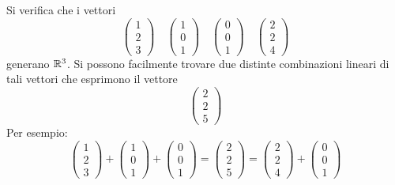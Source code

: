 \begin{example}
	Si verifica che i vettori
	\[
		\begin{pmatrix}
			1 \\ 2 \\ 3
		\end{pmatrix} \quad
		\begin{pmatrix}
			1 \\ 0 \\ 1
		\end{pmatrix} \quad
		\begin{pmatrix}
			0 \\ 0 \\ 1
		\end{pmatrix} \quad
		\begin{pmatrix}
			2 \\ 2 \\ 4
		\end{pmatrix}
	\]
	generano $\mathbb{R}^3$. Si possono facilmente trovare due distinte combinazioni lineari di tali vettori
	che esprimono il vettore
	\[ \begin{pmatrix} 2 \\ 2 \\ 5 \end{pmatrix} \]
	Per esempio:
	\[
		\begin{pmatrix}
			1 \\ 2 \\ 3
		\end{pmatrix} +
		\begin{pmatrix}
			1 \\ 0 \\ 1
		\end{pmatrix} +
		\begin{pmatrix}
			0 \\ 0 \\ 1
		\end{pmatrix} =
		\begin{pmatrix}
			2 \\ 2 \\ 5
		\end{pmatrix} =
		\begin{pmatrix}
			2 \\ 2 \\ 4
		\end{pmatrix} +
		\begin{pmatrix}
			0 \\ 0 \\ 1
		\end{pmatrix}
	\]
\end{example}

